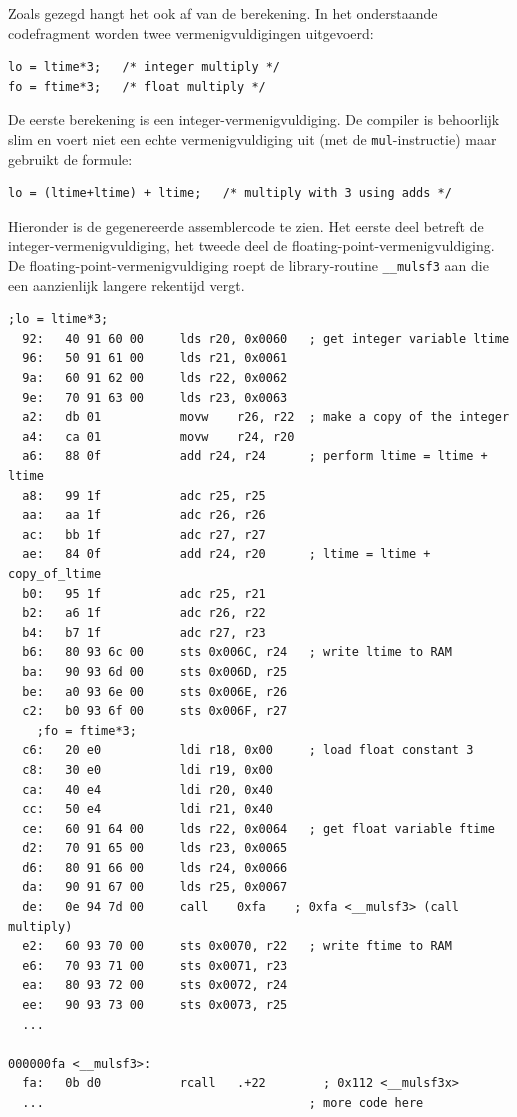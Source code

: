 \documentclass[12pt,a4paper,final,twoside,fleqn]{article}
\def\lstC{\lstinline[style=C]}
\def\lstAVR{\lstinline[style=AVR]}
\begin{document}
Zoals gezegd hangt het ook af van de berekening. In het onderstaande codefragment worden
twee vermenigvuldigingen uitgevoerd:
\begin{lstlisting}[style=C]
lo = ltime*3;   /* integer multiply */
fo = ftime*3;   /* float multiply */
\end{lstlisting}

De eerste berekening is een integer-vermenigvuldiging. De compiler is behoorlijk slim
en voert niet een echte vermenigvuldiging uit (met de \lstAVR{mul}-instructie) maar
gebruikt de formule:
\begin{lstlisting}[style=C]
lo = (ltime+ltime) + ltime;   /* multiply with 3 using adds */
\end{lstlisting}

Hieronder is de gegenereerde assemblercode te zien. Het eerste deel betreft de
integer-vermenigvuldiging, het tweede deel de floating-point-vermenigvuldiging.
De floating-point-vermenigvuldiging roept de library-routine \lstC{__mulsf3} aan die
een aanzienlijk langere rekentijd vergt.

\begin{lstlisting}[style=AVR,caption=Assemblercode van integer en float vermenigvuldigingen met 3.]
	;lo = ltime*3;
  92:	40 91 60 00 	lds	r20, 0x0060   ; get integer variable ltime
  96:	50 91 61 00 	lds	r21, 0x0061
  9a:	60 91 62 00 	lds	r22, 0x0062
  9e:	70 91 63 00 	lds	r23, 0x0063
  a2:	db 01       	movw	r26, r22  ; make a copy of the integer
  a4:	ca 01       	movw	r24, r20
  a6:	88 0f       	add	r24, r24      ; perform ltime = ltime + ltime
  a8:	99 1f       	adc	r25, r25
  aa:	aa 1f       	adc	r26, r26
  ac:	bb 1f       	adc	r27, r27
  ae:	84 0f       	add	r24, r20      ; ltime = ltime + copy_of_ltime
  b0:	95 1f       	adc	r25, r21
  b2:	a6 1f       	adc	r26, r22
  b4:	b7 1f       	adc	r27, r23
  b6:	80 93 6c 00 	sts	0x006C, r24   ; write ltime to RAM
  ba:	90 93 6d 00 	sts	0x006D, r25
  be:	a0 93 6e 00 	sts	0x006E, r26
  c2:	b0 93 6f 00 	sts	0x006F, r27
	;fo = ftime*3;
  c6:	20 e0       	ldi	r18, 0x00	  ; load float constant 3
  c8:	30 e0       	ldi	r19, 0x00
  ca:	40 e4       	ldi	r20, 0x40
  cc:	50 e4       	ldi	r21, 0x40
  ce:	60 91 64 00 	lds	r22, 0x0064   ; get float variable ftime
  d2:	70 91 65 00 	lds	r23, 0x0065
  d6:	80 91 66 00 	lds	r24, 0x0066
  da:	90 91 67 00 	lds	r25, 0x0067
  de:	0e 94 7d 00 	call	0xfa	; 0xfa <__mulsf3> (call multiply)
  e2:	60 93 70 00 	sts	0x0070, r22   ; write ftime to RAM
  e6:	70 93 71 00 	sts	0x0071, r23
  ea:	80 93 72 00 	sts	0x0072, r24
  ee:	90 93 73 00 	sts	0x0073, r25
  ...

000000fa <__mulsf3>:
  fa:	0b d0       	rcall	.+22     	; 0x112 <__mulsf3x>
  ...                                     ; more code here
\end{lstlisting}
\end{document}
